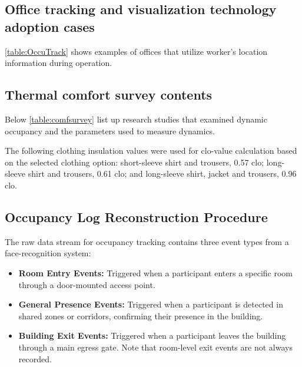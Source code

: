 
\setcounter{table}{0}
\setcounter{figure}{0}
\renewcommand{\thetable}{A.\arabic{table}}
\renewcommand{\thefigure}{A.\arabic{figure}}

\subsection{Office tracking and visualization technology adoption cases}
\label{app:Tracking}
\autoref{table:OccuTrack} shows examples of offices that utilize worker's location information during operation.

\begin{table}[pos=hbt!]
  \centering
  \caption{Office tracking and visualization technology adoption cases in Japan and Singapore}
  
  \label{table:OccuTrack}
\end{table}

\subsection{Thermal comfort survey contents}
\label{app:ThermalSurvey}
Below \autoref{table:comfsurvey} list up research studies that examined dynamic occupancy and the parameters used to measure dynamics.

\begin{table}[pos=htbp!]
  \centering
  \caption{Items in the thermal comfort survey}
  
  \label{table:comfsurvey}
\end{table}

The following clothing insulation values were used for clo-value calculation based on the selected clothing option: short-sleeve shirt and trousers, 0.57 clo; long-sleeve shirt and trousers, 0.61 clo; and long-sleeve shirt, jacket and trousers, 0.96 clo.


\subsection{Occupancy Log Reconstruction Procedure}
\label{app:occupancy_reconstruction}

The raw data stream for occupancy tracking contains three event types from a face-recognition system:
\begin{itemize}[noitemsep]
    \item \textbf{Room Entry Events:} Triggered when a participant enters a specific room through a door-mounted access point.
    \item \textbf{General Presence Events:} Triggered when a participant is detected in shared zones or corridors, confirming their presence in the building.
    \item \textbf{Building Exit Events:} Triggered when a participant leaves the building through a main egress gate. Note that room-level exit events are not always recorded.
\end{itemize}

